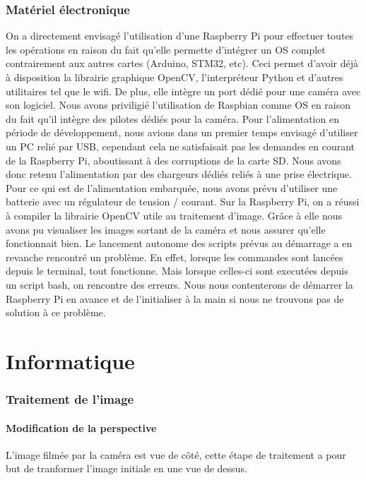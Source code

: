 \documentclass{article}
\begin{document}
\section{Matériel électronique}

On a directement envisagé l'utilisation d'une Raspberry Pi pour effectuer toutes les opérations en raison du fait qu'elle permette d'intégrer un OS complet contrairement aux autres cartes (Arduino, STM32, etc). Ceci permet d'avoir déjà à disposition la librairie graphique OpenCV, l'interpréteur Python et d'autres utilitaires tel que le wifi. De plus, elle intègre un port dédié pour une caméra avec son logiciel. Nous avons priviligié l'utilisation de Raspbian comme OS en raison du fait qu'il intègre des pilotes dédiés pour la caméra.
Pour l'alimentation en période de développement, nous avions dans un premier temps envisagé d'utiliser un PC relié par USB, cependant cela ne satisfaisait pas les demandes en courant de la Raspberry Pi, aboutissant à des corruptions de la carte SD. Nous avons donc retenu l'alimentation par des chargeurs dédiés reliés à une prise électrique. Pour ce qui est de l'alimentation embarquée, nous avons prévu d'utiliser une batterie avec un régulateur de tension / courant.
\newline\newline
Sur la Raspberry Pi, on a réussi à compiler la librairie OpenCV utile au traitement d'image. Grâce à elle nous avons pu visualiser les images sortant de la caméra et nous assurer qu'elle fonctionnait bien.
Le lancement autonome des scripts prévus au démarrage a en revanche rencontré un problème. En effet, lorsque les commandes sont lancées depuis le terminal, tout fonctionne. Mais lorsque celles-ci sont executées depuis un script bash, on rencontre des erreurs. Nous nous contenterons de démarrer la Raspberry Pi en avance et de l'initialiser à la main si nous ne trouvons pas de solution à ce problème.

\newpage
\part{Informatique}
\section{Traitement de l'image}

\subsection{Modification de la perspective}
L'image filmée par la caméra est vue de côté, cette étape de traitement a pour but de tranformer l'image initiale en une vue de dessus.
\end{document}
